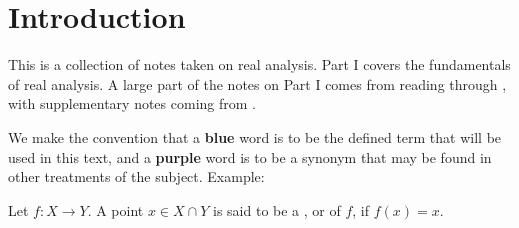 \chapter*{Introduction}

This is a collection of notes taken on real analysis. Part I covers the
fundamentals of real analysis. A large part of the notes on Part I comes from
reading through \cite{rudin1964principles}, with
supplementary notes coming from \cite{abbott2012understanding,guidotti_li}.

We make the convention that a \textbf{\textcolor{cblue}{blue}} word is
to be the defined term that will be used in this text, and a
\textbf{\textcolor{cpurple}{purple}} word is to be a synonym that may be found
in other treatments of the subject. Example:
\begin{define*}
    Let $f: X \to Y$. A point $x \in X \cap Y$ is said to be a
    , or  of $f$, if
    $f(x) = x$.
\end{define*}